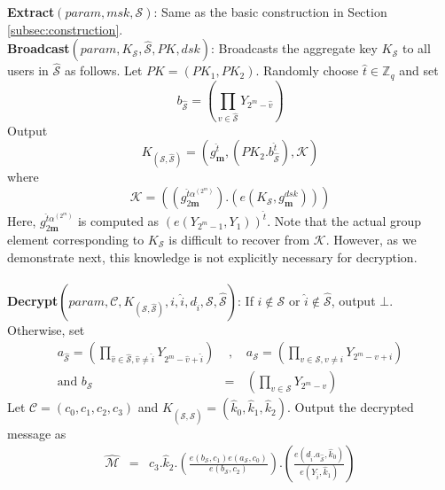 \noindent \textbf{Extract}$(param,msk,\mathcal{S})$: Same as the basic construction in Section \ref{subsec:construction}.\\

\noindent\textbf{Broadcast}$(param,K_{\mathcal{S}},\hat{\mathcal{S}},PK,dsk)$: Broadcasts the aggregate key $K_{\mathcal{S}}$ to all users in $\hat{\mathcal{S}}$ as follows. Let $PK=(PK_1,PK_2)$. Randomly choose $\hat{t}\in\mathbb{Z}_q$ and set
\begin{equation}
 b_{\hat{\mathcal{S}}}=\left(\prod_{\hat{v}\in\hat{\mathcal{S}}}Y_{2^m-\hat{v}}\right) \nonumber
\end{equation}
\noindent Output 
\begin{equation}
K_{\left(\mathcal{S},\hat{\mathcal{S}}\right)}=\left(g^{\hat{t}}_{\mathbf{m}},\left(PK_2.b^{\hat{t}}_{\hat{\mathcal{S}}}\right),\mathcal{K}\right)\nonumber
\end{equation}
\noindent where 
\begin{equation}
\mathcal{K} = \left(\left(g^{\hat{t}\alpha^{(2^m)}}_{2\mathbf{m}}\right).\left(e(K_{\mathcal{S}},g^{dsk}_{\mathbf{m}})\right)\right)\nonumber
\end{equation}
\noindent Here, $g^{\hat{t}\alpha^{(2^m)}}_{2\mathbf{m}}$ is computed as $\left(e(Y_{2^m-1},Y_1)\right)^{\hat{t}}$. Note that the actual group element corresponding to $K_{\mathcal{S}}$ is difficult to recover from $\mathcal{K}$. However, as we demonstrate next, this knowledge is not explicitly necessary for decryption.\\\\
%  
\noindent\textbf{Decrypt}$(param,\mathcal{C},K_{\left(\mathcal{S},\hat{\mathcal{S}}\right)},i,\hat{i},d_{\hat{i}},\mathcal{S},\hat{\mathcal{S}})$: If $i\notin\mathcal{S}$ or $\hat{i}\notin\hat{\mathcal{S}}$, output $\bot$. Otherwise, set
\begin{eqnarray}
 a_{\hat{\mathcal{S}}}=\left(\prod_{\hat{v}\in\hat{\mathcal{S}},\hat{v}\neq \hat{i}}Y_{2^m-\hat{v}+\hat{i}}\right)&\text{ , }&
 a_{\mathcal{S}}=\left(\prod_{v\in\mathcal{S},v\neq i}Y_{2^m-v+i}\right)\nonumber\\ 
 \text{and }b_{\mathcal{S}}&=&\left(\prod_{v\in\mathcal{S}}Y_{2^m-v}\right)\nonumber
\end{eqnarray}
\noindent Let $\mathcal{C}=(c_0,c_1,c_2,c_3)$ and $K_{\left(\mathcal{S},\hat{\mathcal{S}}\right)}=(\hat{k}_0,\hat{k}_1,\hat{k}_2)$. Output the decrypted message as  
\begin{eqnarray} 
\hat{\mathcal{M}}&=&c_3.\hat{k}_2.\left(\frac{e(b_{\mathcal{S}},c_1){e}(a_{\mathcal{S}},c_0)}{{e}(b_{\mathcal{S}},c_2)}\right).\left(\frac{e(d_{\hat{i}}.a_{\hat{\mathcal{S}}},\hat{k}_0)}{e(Y_{\hat{i}},\hat{k}_1)}\right) \nonumber
\end{eqnarray}

